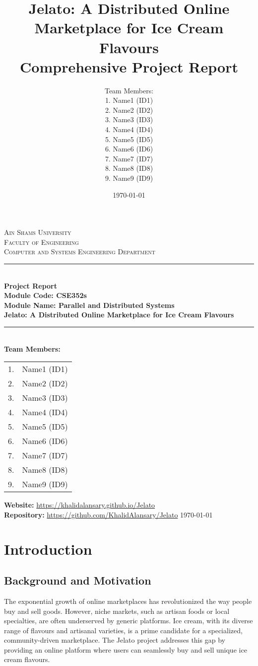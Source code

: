 \documentclass[12pt,a4paper]{report}
\title{
    \vspace*{2cm}
    \Huge\bfseries Jelato: A Distributed Online Marketplace for Ice Cream Flavours\\[1.5em]
    \Large Comprehensive Project Report
}
\author{
    \Large Team Members:\\[0.5em]
    \normalsize
    1. Name1 (ID1)\\
    2. Name2 (ID2)\\
    3. Name3 (ID3)\\
    4. Name4 (ID4)\\
    5. Name5 (ID5)\\
    6. Name6 (ID6)\\
    7. Name7 (ID7)\\
    8. Name8 (ID8)\\
    9. Name9 (ID9)
}
\date{\today}
\begin{document}
\begin{titlepage}
    \begin{center}
        \textsc{\Large Ain Shams University}\\[0.5em]
        \textsc{\large Faculty of Engineering}\\[0.5em]
        \textsc{\large Computer and Systems Engineering Department}\\[2.5em]
        \rule{\textwidth}{2pt}\\[2em]
        {\Huge \textbf{Project Report}}\\[1em]
        {\Large \textbf{Module Code: CSE352s}}\\
        {\Large \textbf{Module Name: Parallel and Distributed Systems}}\\[1em]
        {\LARGE \textbf{Jelato: A Distributed Online Marketplace for Ice Cream Flavours}}\\[2em]
        \rule{\textwidth}{2pt}\\[2.5em]
        \textbf{Team Members:}\\[1em]
        \begin{tabular}{ll}
            1. & Name1 (ID1) \\
            2. & Name2 (ID2) \\
            3. & Name3 (ID3) \\
            4. & Name4 (ID4) \\
            5. & Name5 (ID5) \\
            6. & Name6 (ID6) \\
            7. & Name7 (ID7) \\
            8. & Name8 (ID8) \\
            9. & Name9 (ID9) \\
        \end{tabular}
        \vfill
        \textbf{Website:} \url{https://khalidalansary.github.io/Jelato}\\
        \textbf{Repository:} \url{https://github.com/KhalidAlansary/Jelato}
        \vfill
        \today
    \end{center}
\end{titlepage}

\tableofcontents
\newpage

\chapter{Introduction}
\section{Background and Motivation}
The exponential growth of online marketplaces has revolutionized the way people buy and sell goods. However, niche markets, such as artisan foods or local specialties, are often underserved by generic platforms. Ice cream, with its diverse range of flavours and artisanal varieties, is a prime candidate for a specialized, community-driven marketplace. The Jelato project addresses this gap by providing an online platform where users can seamlessly buy and sell unique ice cream flavours.
\end{document}
